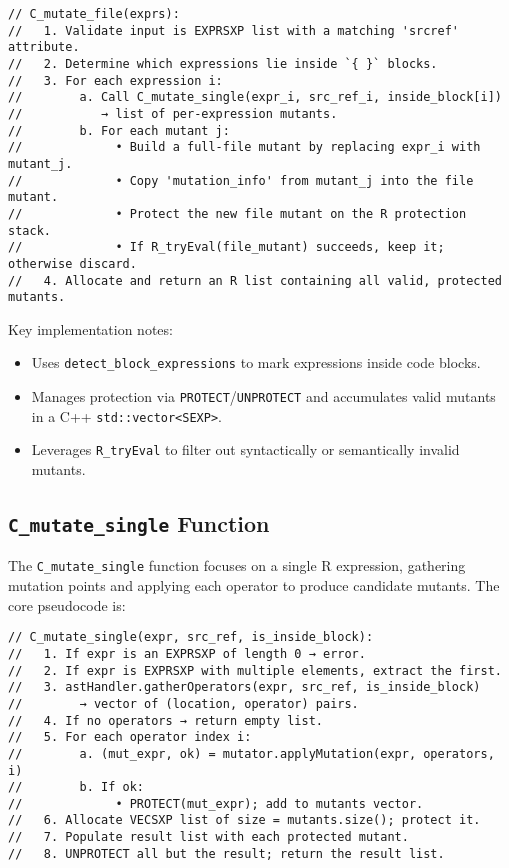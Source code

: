 \begin{verbatim}
// C_mutate_file(exprs):
//   1. Validate input is EXPRSXP list with a matching 'srcref' attribute.
//   2. Determine which expressions lie inside `{ }` blocks.
//   3. For each expression i:
//        a. Call C_mutate_single(expr_i, src_ref_i, inside_block[i]) 
//           → list of per-expression mutants.
//        b. For each mutant j:
//             • Build a full-file mutant by replacing expr_i with mutant_j.
//             • Copy 'mutation_info' from mutant_j into the file mutant.
//             • Protect the new file mutant on the R protection stack.
//             • If R_tryEval(file_mutant) succeeds, keep it; otherwise discard.
//   4. Allocate and return an R list containing all valid, protected mutants.
\end{verbatim}

Key implementation notes:
\begin{itemize}
  \item Uses \texttt{detect\_block\_expressions} to mark expressions inside code blocks.
  \item Manages protection via \texttt{PROTECT}/\texttt{UNPROTECT} and accumulates valid mutants in a C++ \texttt{std::vector<SEXP>}.
  \item Leverages \texttt{R\_tryEval} to filter out syntactically or semantically invalid mutants.
\end{itemize}

\subsection{\texttt{C\_mutate\_single} Function}

The \texttt{C\_mutate\_single} function focuses on a single R expression, gathering mutation points and applying each operator to produce candidate mutants.  The core pseudocode is:

\begin{verbatim}
// C_mutate_single(expr, src_ref, is_inside_block):
//   1. If expr is an EXPRSXP of length 0 → error.
//   2. If expr is EXPRSXP with multiple elements, extract the first.
//   3. astHandler.gatherOperators(expr, src_ref, is_inside_block)
//        → vector of (location, operator) pairs.
//   4. If no operators → return empty list.
//   5. For each operator index i:
//        a. (mut_expr, ok) = mutator.applyMutation(expr, operators, i)
//        b. If ok:
//             • PROTECT(mut_expr); add to mutants vector.
//   6. Allocate VECSXP list of size = mutants.size(); protect it.
//   7. Populate result list with each protected mutant.
//   8. UNPROTECT all but the result; return the result list.
\end{verbatim}

